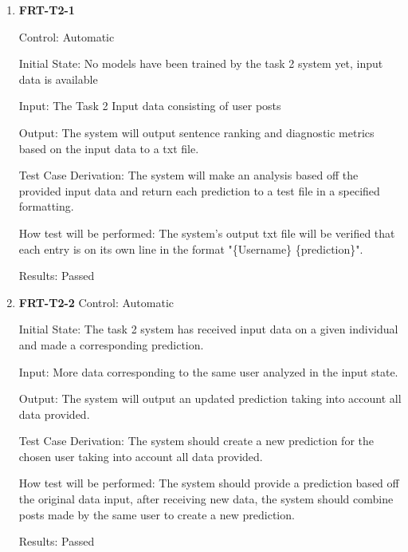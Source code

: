 \documentclass[12pt, titlepage]{article}
\begin{document}
 \begin{enumerate}
 
 \item \textbf{FRT-T2-1}

Control: Automatic

Initial State: No models have been trained by the task 2 system yet, input data is available

Input: The Task 2 Input data consisting of user posts

Output: The system will output sentence ranking and diagnostic metrics based on the input data to a txt file.

Test Case Derivation: The system will make an analysis based off the provided input data and return each prediction to a test file in a specified formatting.

How test will be performed: The system's output txt file will be verified that each entry is on its own line in the format "\{Username\} \{prediction\}".

Results: Passed

 \item \textbf{FRT-T2-2}
 Control: Automatic

Initial State: The task 2 system has received input data on a given individual and made a corresponding prediction.

Input: More data corresponding to the same user analyzed in the input state.

Output: The system will output an updated prediction taking into account all data provided.

Test Case Derivation: The system should create a new prediction for the chosen user taking into account all data provided.

How test will be performed: The system should provide a prediction based off the original data input, after receiving new data, the system should combine posts made by the same user to create a new prediction. 

Results: Passed
 \end{enumerate}
\end{document}
